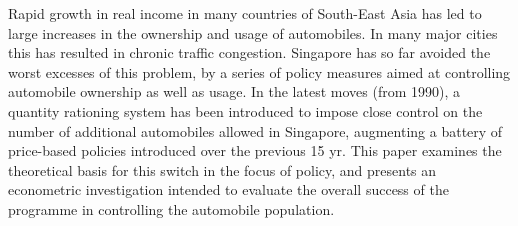 Rapid growth in real income in many countries of South-East Asia has led to large increases in the ownership and usage of automobiles. In many major cities this has resulted in chronic traffic congestion. Singapore has so far avoided the worst excesses of this problem, by a series of policy measures aimed at controlling automobile ownership as well as usage. In the latest moves (from 1990), a quantity rationing system has been introduced to impose close control on the number of additional automobiles allowed in Singapore, augmenting a battery of price-based policies introduced over the previous 15 yr. This paper examines the theoretical basis for this switch in the focus of policy, and presents an econometric investigation intended to evaluate the overall success of the programme in controlling the automobile population.
